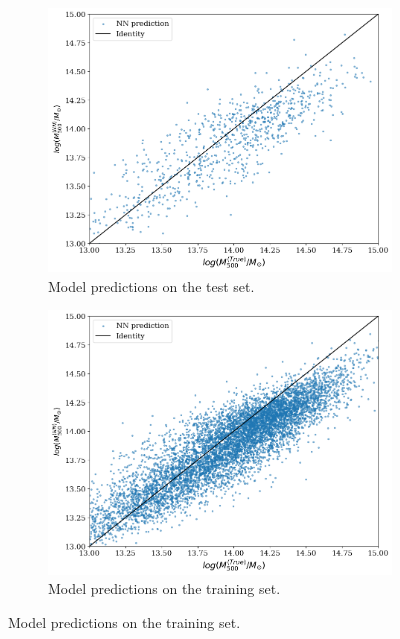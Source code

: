 \begin{figure}[H]
\centering
\begin{subfigure}{.46\textwidth}
  \centering
  \includegraphics[width=\linewidth]{images/Chapter4/Res50V2/resnet50v2_test.png}
  \caption{Model predictions on the test set.}
  \label{fig:best_perf_resnet50v2_a}
\end{subfigure}%
\hspace{.6em}
\begin{subfigure}{.46\textwidth}
  \centering
  \includegraphics[width=\linewidth]{images/Chapter4/Res50V2/resnet50v2_training.png}
  \caption{Model predictions on the training set.}
  \label{fig:best_perf_resnet50v2_b}
\end{subfigure}

\end{figure}
